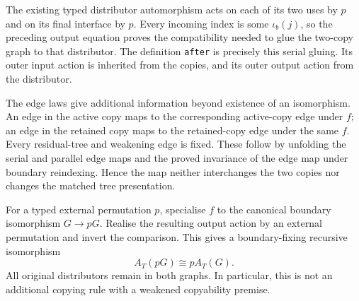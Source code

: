 
The existing typed distributor automorphism acts on each of its two uses by
$p$ and on its final interface by $p$. Every incoming index is some
$\iota_b(j)$, so the preceding output equation proves the compatibility needed
to glue the two-copy graph to that distributor. The definition \texttt{after}
is precisely this serial gluing. Its outer input action is inherited from the
copies, and its outer output action from the distributor.


The edge laws give additional information beyond existence of an isomorphism.
An edge in the active copy maps to the corresponding active-copy edge under
$f$; an edge in the retained copy maps to the retained-copy edge under the same
$f$. Every residual-tree and weakening edge is fixed. These follow by unfolding
the serial and parallel edge maps and the proved invariance of the edge map
under boundary reindexing. Hence the map neither interchanges the two copies
nor changes the matched tree presentation.


For a typed external permutation $p$, specialise $f$ to the canonical boundary
isomorphism $G\to pG$. Realise the resulting output action by an external
permutation and invert the comparison. This gives a boundary-fixing recursive
isomorphism
\[
 A_T(pG)\cong pA_T(G).
\]
All original distributors remain in both graphs. In particular, this is not
an additional copying rule with a weakened copyability premise.


